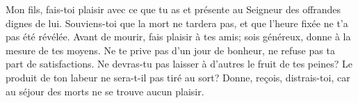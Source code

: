 Mon fils, fais-toi plaisir avec ce que tu as
	et présente au Seigneur des offrandes dignes de lui.
Souviens-toi que la mort ne tardera pas, et que l’heure fixée ne t’a pas été révélée.
Avant de mourir, fais plaisir à tes amis;
	sois généreux, donne à la mesure de tes moyens.
Ne te prive pas d’un jour de bonheur, ne refuse pas ta part de satisfactions.
Ne devras-tu pas laisser à d’autres le fruit de tes peines?
Le produit de ton labeur ne sera-t-il pas tiré au sort?
Donne, reçois, distrais-toi, car au séjour des morts ne se trouve aucun plaisir.
